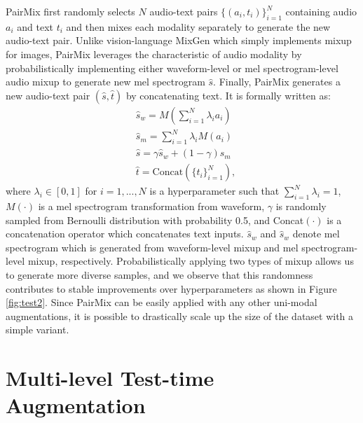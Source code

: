 \documentclass{INTERSPEECH2023}
\begin{document}
PairMix first randomly selects $N$ audio-text pairs $\{(a_i, t_i)\}_{i=1}^{N}$ containing audio $a_i$ and text $t_i$ and then mixes each modality separately to generate the new audio-text pair. Unlike vision-language MixGen which simply implements mixup for images, PairMix leverages the characteristic of audio modality by probabilistically implementing either waveform-level or mel spectrogram-level audio mixup to generate new mel spectrogram $\hat{s}$. Finally, PairMix generates a new audio-text pair $(\hat{s}, \hat{t})$ by concatenating text. It is formally written as:
\begin{equation} \label{PairMix}
\begin{split}
&\hat{s}_w = M(\sum^N_{i=1}\lambda_i a_i) \\
&\hat{s}_m = \sum^N_{i=1}\lambda_i M(a_i) \\
&\hat{s} = \gamma \hat{s}_w + (1-\gamma) \hat{s}_m\\
&\hat{t} = \text{Concat}(\{t_i\}_{i=1}^N),
\end{split}
\end{equation}
where $\lambda_i\in[0,1]$ for $i=1,...,N$ is a hyperparameter such that $\sum_{i=1}^N \lambda_i=1$, $M(\cdot)$ is a mel spectrogram transformation from waveform, $\gamma$ is randomly sampled from Bernoulli distribution with probability 0.5, and Concat$(\cdot)$ is a concatenation operator which concatenates text inputs. $\hat{s}_w$ and $\hat{s}_w$ denote mel spectrogram which is generated from waveform-level mixup and mel spectrogram-level mixup, respectively. Probabilistically applying two types of mixup allows us to generate more diverse samples, and we observe that this randomness contributes to stable improvements over hyperparameters as shown in Figure \ref{fig:test2}. Since PairMix can be easily applied with any other uni-modal augmentations, it is possible to drastically scale up the size of the dataset with a simple variant.

\section{Multi-level Test-time Augmentation}
\label{sec:pagestyle}
\end{document}
